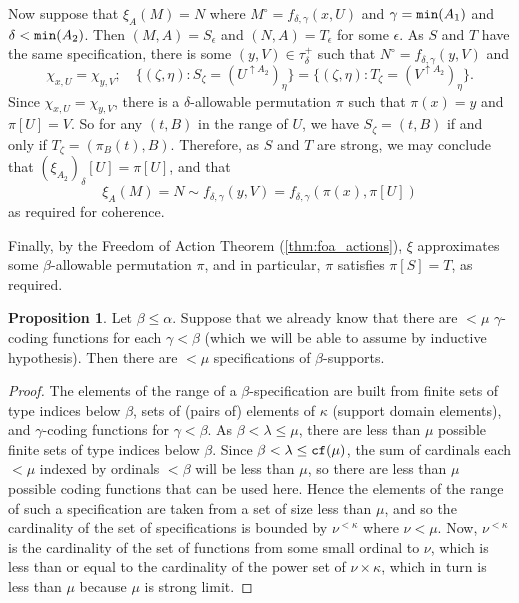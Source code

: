 \documentclass{article}
\newif\ifshowannotations
\newcommand{\annot}[1]{\ifshowannotations\marginpar{#1}\fi}
\theoremstyle{definition}
\newtheorem{proposition}[theorem]{Proposition}
\theoremstyle{remark}
\begin{document}
{Now suppose that $\xi_A(M) = N$ where $M^\circ = f_{\delta,\gamma}(x, U)$ and $\gamma = {\tt min}(A_1)$ and $\delta < {\tt min}(A_2)$.
Then $(M,A) = S_\epsilon$ and $(N,A) = T_\epsilon$ for some $\epsilon$.
As $S$ and $T$ have the same specification, there is some $(y,V) \in \tau_\delta^+$ such that $N^\circ = f_{\delta,\gamma}(y,V)$ and
$$ \chi_{x,U} = \chi_{y,V};\quad \{ ( \zeta, \eta ) : S_\zeta = (U^{\uparrow A_2})_\eta \} = \{ ( \zeta, \eta ) : T_\zeta = (V^{\uparrow A_2})_\eta \}. $$
Since $\chi_{x,U} = \chi_{y,V}$, there is a $\delta$-allowable permutation $\pi$ such that $\pi(x) = y$ and $\pi[U] = V$.
So for any $(t,B)$ in the range of $U$, we have $S_\zeta = (t,B)$ if and only if $T_\zeta = (\pi_B(t),B)$.
Therefore, as $S$ and $T$ are strong, we may conclude that $(\xi_{A_2})_\delta[U] = \pi[U]$, and that
$$ \xi_A(M) = N \sim f_{\delta,\gamma}(y,V) = f_{\delta,\gamma}(\pi(x),\pi[U]) $$
as required for coherence.

Finally, by the Freedom of Action Theorem (\ref{thm:foa_actions}), $\xi$ approximates some $\beta$-allowable permutation $\pi$, and in particular, $\pi$ satisfies $\pi[S] = T$, as required.
\fi

\begin{proposition}\label{prop:count_spec}
  Let $\beta \leq \alpha$.
Suppose that we already know that there are $<\mu$ $\gamma$-coding functions for each $\gamma<\beta$ (which we will be able to assume by inductive hypothesis).
Then there are $<\mu$ specifications of $\beta$-supports.
\end{proposition}
\begin{proof}
The elements of the range of a $\beta$-specification are built from finite sets of type indices below $\beta$, sets of (pairs\annot{We do not understand the referee's comment here, as we seem to have supplied what he is asking for just above already.} of) elements of $\kappa$ (support domain elements), and $\gamma$-coding functions for $\gamma < \beta$.
As $\beta < \lambda \leq \mu$, there are less than $\mu$ possible finite sets of type indices below $\beta$.
Since $\beta < \lambda \leq {\tt cf}(\mu)$, the sum of cardinals each $<\mu$ indexed by ordinals $<\beta$ will be less than $\mu$, so there are less than $\mu$ possible coding functions that can be used here.
Hence the elements of the range of such a specification are taken from a set of size less than $\mu$, and so the cardinality of the set of specifications is bounded by $\nu^{<\kappa}$ where $\nu < \mu$.
Now, $\nu^{<\kappa}$ is the cardinality of the set of functions from some small ordinal to $\nu$, which is less than or equal to the cardinality of the power set of $\nu \times \kappa$, which in turn is less than $\mu$ because $\mu$ is strong limit.


\end{proof}}
\end{document}
